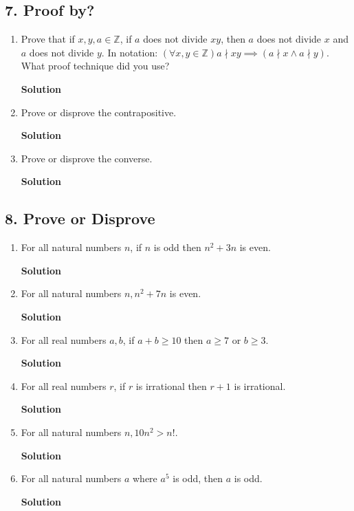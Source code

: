 \documentclass{article}
\begin{document}
\subsection*{7. Proof by?}
\begin{enumerate}
\item Prove that if $x,y,a\in\mathbb Z$, if $a$ does not divide $xy$, then $a$ does not divide $x$ and $a$ does not divide $y$. In notation: $(\forall x,y\in\mathbb Z) a\nmid xy\implies (a\nmid x\land a\nmid y)$. What proof technique did you use?
\begin{mdframed}
\textbf{Solution}

\end{mdframed}
\item Prove or disprove the contrapositive.
\begin{mdframed}
\textbf{Solution}

\end{mdframed}
\item Prove or disprove the converse.
\begin{mdframed}
\textbf{Solution}

\end{mdframed}
\end{enumerate}


\subsection*{8. Prove or Disprove}
\begin{enumerate}
\item For all natural numbers $n$, if $n$ is odd then $n^2 + 3n$ is even.
\begin{mdframed}
\textbf{Solution}

\end{mdframed}
\item For all natural numbers $n, n^2 + 7n$ is even.
\begin{mdframed}
\textbf{Solution}

\end{mdframed}
\item For all real numbers $a,b$, if $a+b\ge10$ then $a\ge7$ or $b\ge3$.
\begin{mdframed}
\textbf{Solution}

\end{mdframed}
\item For all real numbers $r$, if $r$ is irrational then $r + 1$ is irrational.
\begin{mdframed}
\textbf{Solution}

\end{mdframed}
\item For all natural numbers $n, 10n^2 > n!$.
\begin{mdframed}
\textbf{Solution}

\end{mdframed}
\item For all natural numbers $a$ where $a^5$ is odd, then $a$ is odd.
\begin{mdframed}
\textbf{Solution}

\end{mdframed}
\end{enumerate}
\end{document}

